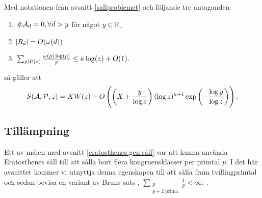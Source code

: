 \begin{theorem}\label{thm:EratosthenesSieve}
Med notationen från avsnitt \ref{sallproblemet} och följande tre antaganden 
\begin{enumerate}
    \item \(\card{\A_d} = 0, \forall d > y\) för något \(y \in \mathbb{R}_+\)
    \item \(\abs{R_d} = O(\omega(d))\)
    \item \(\sum_{p \divides P(z)} \frac{\omega(p) \log(p)}{p} \leq \kappa \log(z) + O(1)\).
\end{enumerate}
så gäller att
\begin{align*}
    \S{A}{P}{z} = X W(z) + O\left(\left(X + \frac{y}{\log z} \right) (\log z)^{\kappa + 1} \exp{\left(-\frac{\log y}{\log z}\right)} \right). 
\end{align*}

\end{theorem}


\subsection{Tillämpning}


Ett av målen med avsnitt \ref{eratosthenes.gen.såll} var att kunna använda Eratosthenes såll till att sålla bort flera kongruensklasser per primtal $p$. I det här avsnittet kommer vi utnyttja denna egenskapen till att sålla fram tvillingprimtal och sedan bevisa en variant av Bruns sats \cite[Korollarium 5.4.5]{cojocarumurty}, \(\sum_{\substack{p \\ p + 2 \text{ prima}}} \frac{1}{p} < \infty\). . 

